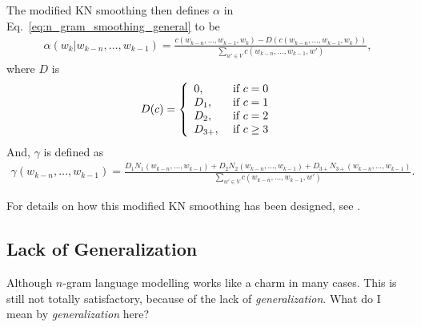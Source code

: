 \documentclass{report}
\begin{document}
The modified KN smoothing then defines $\alpha$ in
Eq.~\eqref{eq:n_gram_smoothing_general} to be
\begin{align*}
    \alpha(w_k | w_{k-n}, \ldots, w_{k-1}) =
    \frac{
        c(w_{k-n}, \ldots, w_{k-1}, w_k) - D(c(w_{k-n}, \ldots, w_{k-1}, w_k))
    }{
        \sum_{w' \in V} c(w_{k-n}, \ldots, w_{k-1}, w')
    },
\end{align*}
where $D$ is
\begin{align*}
    D(c) = \left\{
        \begin{array}{l l}
            0,&\text{ if }c=0 \\
            D_1,&\text{ if }c=1 \\
            D_2,&\text{ if }c=2 \\
            D_{3+},&\text{ if }c\geq 3 \\
        \end{array}
        \right.
\end{align*}
And, $\gamma$ is defined as
\begin{align*}
    \gamma(w_{k-n}, \ldots, w_{k-1})  = 
    \frac{
        D_1 N_1(w_{k-n}, \ldots, w_{k-1}) 
        + D_2 N_2(w_{k-n}, \ldots, w_{k-1})
        + D_{3+} N_{3+}(w_{k-n}, \ldots, w_{k-1})
    }{
        \sum_{w' \in V} c(w_{k-n}, \ldots, w_{k-1}, w')
    }.
\end{align*}

For details on how this modified KN smoothing has been designed, see
\citet{chen1996empirical}.






\subsection{Lack of Generalization}

Although $n$-gram language modelling works like a charm in many cases. This is
still not totally satisfactory, because of the lack of {\em generalization}.
What do I mean by {\em generalization} here?
\end{document}
